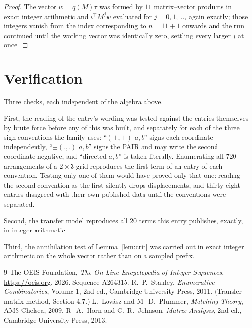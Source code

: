 \documentclass[11pt,a4paper]{article}
\theoremstyle{plain}
\theoremstyle{definition}
\begin{document}
\begin{proof}
The vector $w=q(M)\tau$ was formed by $11$ matrix--vector products in exact integer
arithmetic and $\iota^{\!\top}M^{j}w$ evaluated for $j=0,1,\dots$, again exactly; those
integers vanish from the index corresponding to $n=11+1$ onwards and the run continued
until the working vector was identically zero, settling every larger $j$ at once.
\end{proof}

\section{Verification}

Three checks, each independent of the algebra above.

First, the reading of the entry's wording was tested against the entries themselves by brute
force before any of this was built, and separately for each of the three sign conventions the
family uses: ``$(\pm,\pm)$ $a,b$'' signs each coordinate independently, ``$\pm(.,.)$ $a,b$''
signs the PAIR and may write the second coordinate negative, and ``directed $a,b$'' is taken
literally. Enumerating all $720$ arrangements of a $2\times3$ grid reproduces the first term
of an entry of each convention. Testing only one of them would have proved only that one:
reading the second convention as the first silently drops displacements, and thirty-eight
entries disagreed with their own published data until the conventions were separated.

Second, the transfer model reproduces all $20$ terms this entry publishes, exactly, in
integer arithmetic.

Third, the annihilation test of Lemma~\ref{lem:crit} was carried out in exact integer
arithmetic on the whole vector rather than on a sampled prefix.

\begin{thebibliography}{9}
 The OEIS Foundation, \emph{The On-Line Encyclopedia of Integer
Sequences}, \url{https://oeis.org}, 2026. Sequence A264315.
 R.~P.~Stanley, \emph{Enumerative Combinatorics}, Volume 1, 2nd ed.,
Cambridge University Press, 2011. (Transfer-matrix method, Section 4.7.)
 L.~Lov\'asz and M.~D.~Plummer, \emph{Matching Theory}, AMS Chelsea, 2009.
 R.~A.~Horn and C.~R.~Johnson, \emph{Matrix Analysis}, 2nd ed., Cambridge
University Press, 2013.
\end{thebibliography}
\end{document}
